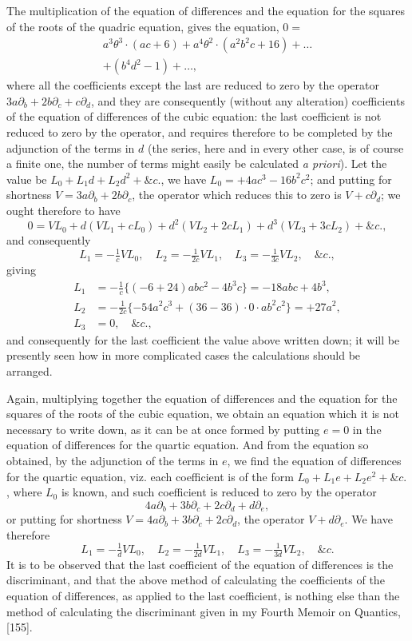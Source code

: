 \documentclass[11pt,a4paper]{book}
\begin{document}
The multiplication of the equation of differences and the equation for the squares of the roots of the quadric equation, gives the equation, $0=$
\begin{multline*}
a^3\theta^3\cdot(ac+6)+a^4\theta^2\cdot(a^2b^2c+16)+\ldots\\
+(b^4d^2-1)+\ldots,
\end{multline*}
where all the coefficients except the last are reduced to zero by the operator $3a\partial_b+2b\partial_c+c\partial_d$, and they are consequently (without any alteration) coefficients of the equation of differences of the cubic equation: the last coefficient is not reduced to zero by the operator, and requires therefore to be completed by the adjunction of the terms in $d$ (the series, here and in every other case, is of course a finite one, the number of terms might easily be calculated \textit{a priori}). Let the value be $L_0+L_1d+L_2d^2+\&c.$, we have $L_0=+4ac^3-16b^2c^2$; and putting for shortness $V=3a\partial_b+2b\partial_c$, the operator which reduces this to zero is $V+c\partial_d$; we ought therefore to have
\[
0=VL_0+d(VL_1+cL_0)+d^2(VL_2+2cL_1)+d^3(VL_3+3cL_2)+\&c.,
\]
and consequently
\[
L_1=-\tfrac{1}{c}VL_0,\quad L_2=-\tfrac{1}{2c}VL_1,\quad L_3=-\tfrac{1}{3c}VL_2,\quad \&c.,
\]
giving
\begin{align*}
L_1 &= -\tfrac{1}{c}\{(-6+24)abc^2-4b^3c\}=-18abc+4b^3,\\
L_2 &= -\tfrac{1}{2c}\{-54a^2c^3+(36-36)\cdot0\cdot a b^2c^2\}=+27a^2,\\
L_3 &= 0,\quad \&c.,
\end{align*}
and consequently for the last coefficient the value above written down; it will be presently seen how in more complicated cases the calculations should be arranged.

Again, multiplying together the equation of differences and the equation for the squares of the roots of the cubic equation, we obtain an equation which it is not necessary to write down, as it can be at once formed by putting $e=0$ in the equation of differences for the quartic equation. And from the equation so obtained, by the adjunction of the terms in $e$, we find the equation of differences for the quartic equation, viz. each coefficient is of the form $L_0+L_1e+L_2e^2+\&c.$, where $L_0$ is known, and such coefficient is reduced to zero by the operator
\[
4a\partial_b+3b\partial_c+2c\partial_d+d\partial_e,
\]
or putting for shortness $V=4a\partial_b+3b\partial_c+2c\partial_d$, the operator $V+d\partial_e$. We have therefore
\[
L_1=-\tfrac{1}{d}VL_0,\quad L_2=-\tfrac{1}{2d}VL_1,\quad L_3=-\tfrac{1}{3d}VL_2,\quad \&c.
\]
It is to be observed that the last coefficient of the equation of differences is the discriminant, and that the above method of calculating the coefficients of the equation of differences, as applied to the last coefficient, is nothing else than the method of calculating the discriminant given in my Fourth Memoir on Quantics, [155].
\end{document}
